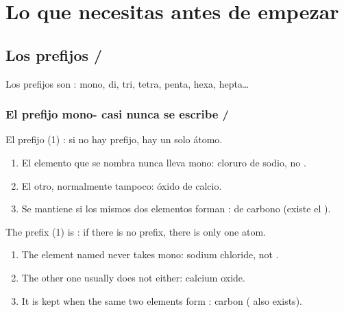 \section{Lo que necesitas antes de empezar}

\subsection{Los prefijos / }

Los prefijos son : mono, di, tri, tetra, penta, hexa, hepta…


\subsubsection*{El prefijo mono- casi nunca se escribe / }

\begin{reglas}
    El prefijo  (1) : si no hay prefijo, hay un solo átomo.
    \begin{enumerate}[label=\numberballgreen]
        \item El elemento que se nombra  nunca lleva mono:  cloruro de sodio, no .
        \item El otro, normalmente tampoco:  óxido de calcio.
        \item Se mantiene si los mismos dos elementos forman :   de carbono (existe el ).
    \end{enumerate}
    \ingles
    The prefix  (1) is : if there is no prefix, there is only one atom.
    \begin{enumerate}[label=\numberballgreen]
        \item The element named  never takes mono:  sodium chloride, not .
        \item The other one usually does not either:  calcium oxide.
        \item It is kept when the same two elements form :  carbon  ( also exists).
    \end{enumerate}
\end{reglas}

